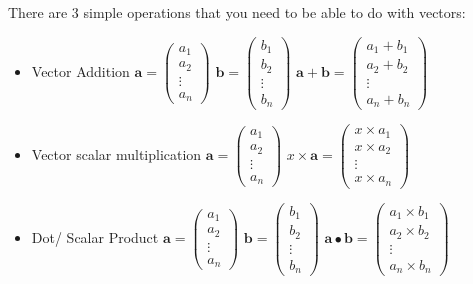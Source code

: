   There are 3 simple operations that you need to be able to do with vectors:
  \begin{itemize}
  	\item Vector Addition
	  	\subitem $\textbf{a} = \left( \begin{smallmatrix} a_1 \\ a_2 \\ \vdots \\ a_n \end{smallmatrix}\right)$
	  	\subitem $\textbf{b} = \left( \begin{smallmatrix} b_1 \\ b_2 \\ \vdots \\ b_n\end{smallmatrix}\right)$ 
	  	\subitem $\textbf{a} + \textbf{b} = \left( \begin{smallmatrix} a_1+b_1 \\ a_2+b_2 \\ \vdots \\ a_n+b_n\end{smallmatrix}\right)$
  	\item Vector scalar multiplication
	  	\subitem $\textbf{a} = \left( \begin{smallmatrix} a_1 \\ a_2 \\ \vdots \\ a_n \end{smallmatrix}\right)$
	  	\subitem $x \times \textbf{a} = \left( \begin{smallmatrix} x \times a_1 \\ x \times a_2 \\ \vdots \\ x \times a_n\end{smallmatrix}\right)$
  	\item Dot/ Scalar Product
	  	\subitem $\textbf{a} = \left( \begin{smallmatrix} a_1 \\ a_2 \\ \vdots \\ a_n \end{smallmatrix}\right)$
	  	\subitem $\textbf{b} = \left( \begin{smallmatrix} b_1 \\ b_2 \\ \vdots \\ b_n\end{smallmatrix}\right)$ 
	  	\subitem $\textbf{a} \bullet \textbf{b} = \left( \begin{smallmatrix} a_1 \times b_1 \\ a_2 \times b_2 \\ \vdots \\ a_n \times b_n\end{smallmatrix}\right)$
  \end{itemize}
  
